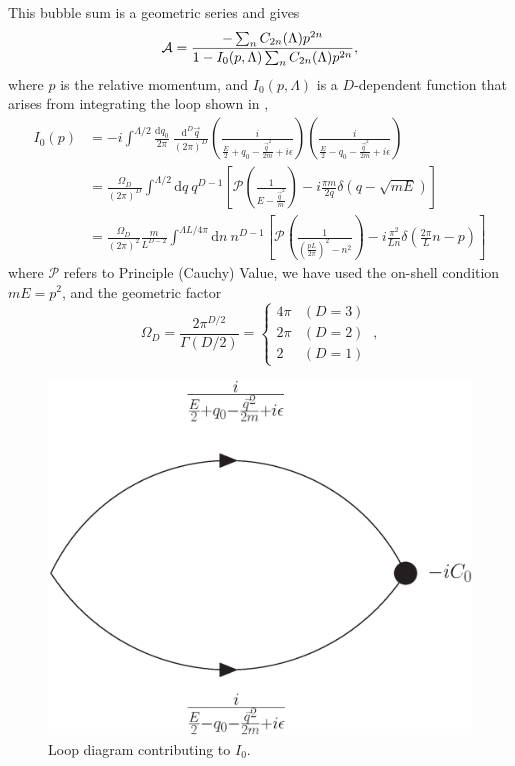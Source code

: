 This bubble sum is a geometric series and gives\cite{Kaplan:1998we,Beane:2003da}
\begin{equation}\label{eq:scattering amplitude}
\mathcal{A} = \frac{-\sum_n C_{2n}(\Lambda) p^{2n}}{1-I_0(p,\Lambda) \sum_n C_{2n}(\Lambda) p^{2n}},
\end{equation}
where $p$ is the relative momentum,  and $I_0(p,\Lambda)$ is a $D$-dependent function that arises from integrating the loop shown in ,
\begin{align}
    I_0(p)
    &=-i\int^{\Lambda/2}
        \frac { \mathrm {d}q_0}{2\pi}\ \frac{\mathrm { d } ^ { D } \vec{ q } } { (2\pi)^ { D } }
        \left( \frac { i } { \frac{E}{2} + q _ { 0 } - \frac{\vec{q}^2}{2m} + i \epsilon } \right)
        \left( \frac { i } { \frac{E}{2} - q _ { 0 } - \frac{\vec{q}^2}{2m} + i \epsilon } \right)
    \nonumber\\
    &=\frac{\Omega_D}{(2\pi)^D}\int^{\Lambda/2}  \mathrm { d } q \ q^{D-1}\left[\mathcal{P} \left( \frac { 1 } { E - \frac{\vec{q}^2}{m} } \right)
-i\frac{\pi m}{2q}\delta(q-\sqrt{mE})\right]
    \\
    &=\frac{\Omega_D}{(2\pi)^2}\frac{m}{L^{D-2}}\int^{\Lambda L/4\pi}  \mathrm { d } n \ n^{D-1}\left[\mathcal{P} \left( \frac { 1 } { \left(\frac{pL}{2\pi}\right)^2 - n^2 } \right)
-i\frac{\pi^2}{L n}\delta\left(\frac{2\pi}{L}n -p\right)\right]
    \label{eq:I0}
\end{align}
where $\mathcal{P}$ refers to Principle (Cauchy) Value, we have used the on-shell condition $mE=p^2$, and the geometric factor
\begin{equation}
\Omega_D=\frac{2\pi^{D/2}}{\Gamma(D/2)}=
    \begin{cases}
        4\pi    &   (D=3)\\
        2\pi    &   (D=2)\\
        2       &   (D=1)
    \end{cases}\ ,
\end{equation}

\begin{figure}[h!]
\center
\includegraphics[width=.35\columnwidth]{figure/I0.eps}
\caption{Loop diagram contributing to $I_0$.\label{fig:I0} }
\end{figure}

